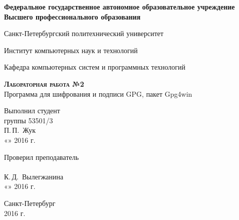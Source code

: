\documentclass[10pt,a4paper,titlepage]{article}
\begin{document}
\begin{titlepage}
  \begin{center}
    \large
    \textbf{Федеральное государственное автономное образовательное учреждение\\
    Высшего профессионального образования}

    \vspace{0.25cm}

    Санкт-Петербургский политехнический университет
    \vspace{0.25cm}
    
    Институт компьютерных наук и технологий
    \vspace{0.25cm}
    
    Кафедра компьютерных систем и программных технологий
    \vfill

    \textbf{\textsc{Лабораторная работа №2}}\\[5mm]
    
    {\LARGE Программа для шифрования и подписи GPG, пакет Gpg4win}
  \bigskip
    
\end{center}
\vfill

\newlength{\ML}
\hfill\begin{minipage}{0.4\textwidth}
  Выполнил студент\\ группы 53501/3\\
  \underline{\hspace{\ML}} П.\,П.~Жук\\
  «\underline{\hspace{0.7cm}}» \underline{\hspace{2cm}} 2016 г.
\end{minipage}%
\bigskip

\hfill\begin{minipage}{0.4\textwidth}
  Проверил преподаватель\\
  \underline{\hspace{\ML}}\\ К.\,Д.~Вылегжанина\\
  «\underline{\hspace{0.7cm}}» \underline{\hspace{2cm}} 2016 г.
\end{minipage}%
\vfill

\begin{center}
  Санкт-Петербург\\ 2016 г.
\end{center}
\end{titlepage}
\end{document}
